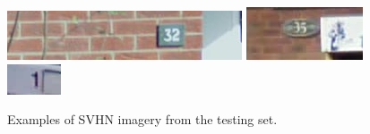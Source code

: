 \documentclass[12pt]{article}
\begin{document}
\begin{figure}
	\includegraphics[width=\linewidth]{images/test/37.png}
\endminipage\hfill
{}
	\includegraphics[width=\linewidth]{images/test/38.png}
\endminipage\hfill
{}
	\includegraphics[width=\linewidth]{images/test/39.png}
\endminipage\hfill
\caption{Examples of SVHN imagery from the testing set.}
\label{fig:example_test_imagery}
\end{figure}
\end{document}
